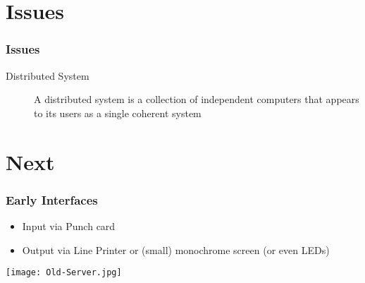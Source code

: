 \documentclass{beamer}
\begin{document}
\section{Issues}
  \begin{frame}
  	\frametitle{Issues}
  	\begin{description}
  		\item[Distributed System] A distributed system is a collection of independent computers that appears to its users as a single coherent system
  	\end{description}
  \end{frame}
\section{Next}
  \begin{frame}
  	\frametitle{Early Interfaces}
  	\begin{itemize}
  		\item Input via Punch card
  		\item Output via Line Printer or (small) monochrome screen (or even LEDs)
  	\end{itemize}
  	\texttt{[image: Old-Server.jpg]}
  	
  \end{frame}
\end{document}
